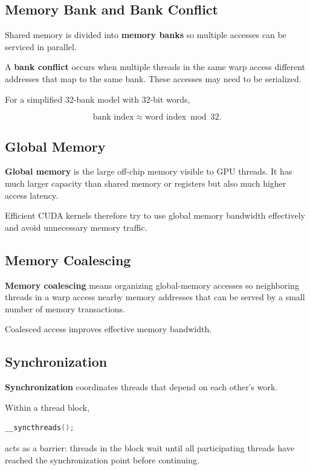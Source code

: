 \documentclass[11pt,a4paper]{article}
\begin{document}
\subsection{Memory Bank and Bank Conflict}

Shared memory is divided into \textbf{memory banks} so multiple accesses can be serviced in parallel.

A \textbf{bank conflict} occurs when multiple threads in the same warp access different addresses that map to the same bank. These accesses may need to be serialized.

For a simplified 32-bank model with 32-bit words,

\[
\text{bank index}
\approx
\text{word index}\bmod 32.
\]

\subsection{Global Memory}

\textbf{Global memory} is the large off-chip memory visible to GPU threads. It has much larger capacity than shared memory or registers but also much higher access latency.

Efficient CUDA kernels therefore try to use global memory bandwidth effectively and avoid unnecessary memory traffic.

\subsection{Memory Coalescing}

\textbf{Memory coalescing} means organizing global-memory accesses so neighboring threads in a warp access nearby memory addresses that can be served by a small number of memory transactions.

Coalesced access improves effective memory bandwidth.

\subsection{Synchronization}

\textbf{Synchronization} coordinates threads that depend on each other's work.

Within a thread block,

\begin{lstlisting}[language=C++]
__syncthreads();
\end{lstlisting}

acts as a barrier: threads in the block wait until all participating threads have reached the synchronization point before continuing.
\end{document}
